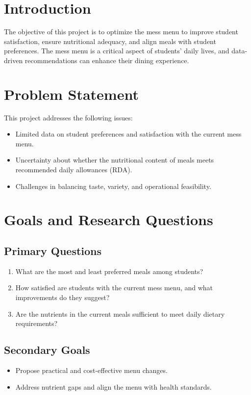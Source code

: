 \documentclass[12pt,a4paper]{article}
\date{}
\begin{document}
\vspace{-0.8in}

\section*{Introduction}
The objective of this project is to optimize the mess menu to improve student satisfaction, ensure nutritional adequacy, and align meals with student preferences. The mess menu is a critical aspect of students' daily lives, and data-driven recommendations can enhance their dining experience.

\section*{Problem Statement}
This project addresses the following issues:
\begin{itemize}
    \item Limited data on student preferences and satisfaction with the current mess menu.
    \item Uncertainty about whether the nutritional content of meals meets recommended daily allowances (RDA).
    \item Challenges in balancing taste, variety, and operational feasibility.
\end{itemize}

\section*{Goals and Research Questions}
\subsection*{Primary Questions}
\begin{enumerate}
    \item What are the most and least preferred meals among students?
    \item How satisfied are students with the current mess menu, and what improvements do they suggest?
    \item Are the nutrients in the current meals sufficient to meet daily dietary requirements?
\end{enumerate}

\subsection*{Secondary Goals}
\begin{itemize}
    \item Propose practical and cost-effective menu changes.
    \item Address nutrient gaps and align the menu with health standards.
\end{itemize}
\end{document}
